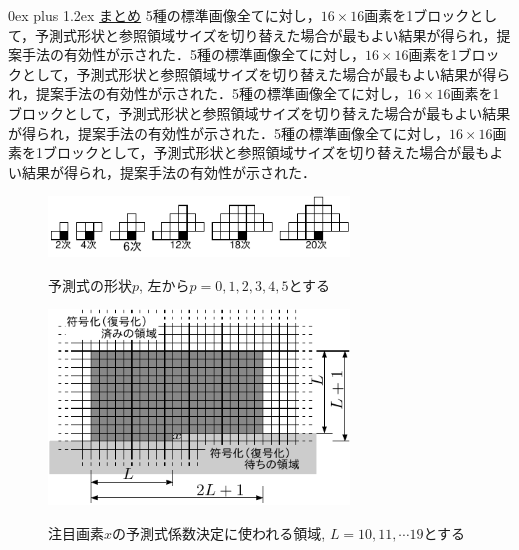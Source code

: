 \documentclass[9pt,dvipdfmx]{jsarticle}
\makeatletter
\def\section{\@startsection {section}{1}{\z@}
{1ex plus -1ex minus-.2ex}%
{0ex plus 1.2ex}%
 {\normalsize\bf}%
 }
\makeatother
\begin{document}
\section{\underline{まとめ}}
5種の標準画像全てに対し，$16\times 16$画素を1ブロックとして，予測式形状と参照領域サイズを切り替えた場合が最もよい結果が得られ，提案手法の有効性が示された．5種の標準画像全てに対し，$16\times 16$画素を1ブロックとして，予測式形状と参照領域サイズを切り替えた場合が最もよい結果が得られ，提案手法の有効性が示された．5種の標準画像全てに対し，$16\times 16$画素を1ブロックとして，予測式形状と参照領域サイズを切り替えた場合が最もよい結果が得られ，提案手法の有効性が示された．5種の標準画像全てに対し，$16\times 16$画素を1ブロックとして，予測式形状と参照領域サイズを切り替えた場合が最もよい結果が得られ，提案手法の有効性が示された．


\begin{figure}[t]
   \begin{center}
    \vspace{2mm}
   \includegraphics[width=80mm]{fig/fig1.pdf}
   \caption{予測式の形状$p$, 左から$p=0,1,2,3,4,5$とする}
   \label{takago-paper2008080800268-fig:1}
%
   \vspace{2mm}
\includegraphics[width=80mm]{fig/fig2.pdf}
\caption{注目画素$x$の予測式係数決定に使われる領域, $L=10,11,\cdots19$とする}
\label{takago-paper2008080800268-fig:2}
   \end{center}
\end{figure}
\end{document}
